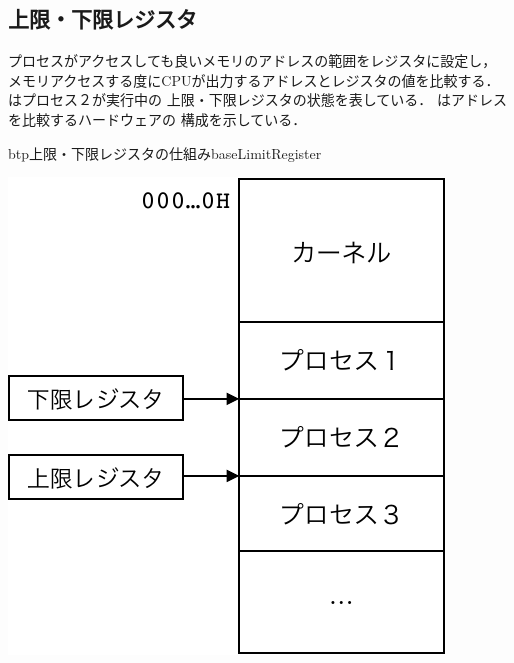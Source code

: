\subsection{上限・下限レジスタ}
プロセスがアクセスしても良いメモリのアドレスの範囲をレジスタに設定し，
メモリアクセスする度にCPUが出力するアドレスとレジスタの値を比較する．
はプロセス２が実行中の
上限・下限レジスタの状態を表している．
はアドレスを比較するハードウェアの
構成を示している．

\begin{myfig}{btp}{上限・下限レジスタの仕組み}{baseLimitRegister}
  \begin{minipage}{0.49\columnwidth}
    \begin{center}
      \includegraphics[scale=0.6]{Fig/baseLimitAddrSpace-crop.pdf}
      \label{fig:baseLimitAddrSpace}
    \end{center}
  \end{minipage}
  \begin{minipage}{0.49\columnwidth}
    \begin{center}

\end{center}
\end{minipage}
\end{myfig}
